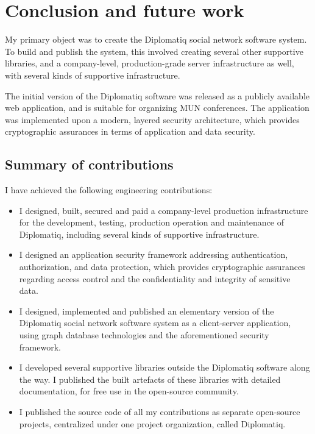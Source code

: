 \chapter{Conclusion and future work}
\label{chapter:conclusion}

My primary object was to create the Diplomatiq social network software system. To build and publish the system, this involved creating several other supportive libraries, and a company-level, production-grade server infrastructure as well, with several kinds of supportive infrastructure.

The initial version of the Diplomatiq software was released as a publicly available web application, and is suitable for organizing MUN conferences. The application was implemented upon a modern, layered security architecture, which provides cryptographic assurances in terms of application and data security.

\section{Summary of contributions}

I have achieved the following engineering contributions:

\begin{itemize}
\item I designed, built, secured and paid a company-level production infrastructure for the development, testing, production operation and maintenance of Diplomatiq, including several kinds of supportive infrastructure.
\item I designed an application security framework addressing authentication, authorization, and data protection, which provides cryptographic assurances regarding access control and the confidentiality and integrity of sensitive data.
\item I designed, implemented and published an elementary version of the Diplomatiq social network software system as a client-server application, using graph database technologies and the aforementioned security framework.
\item I developed several supportive libraries outside the Diplomatiq software along the way. I published the built artefacts of these libraries with detailed documentation, for free use in the open-source community.
\item I published the source code of all my contributions as separate open-source projects, centralized under one project organization, called Diplomatiq.
\end{itemize}

